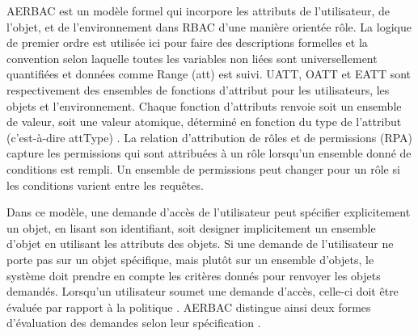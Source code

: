 \label{sectionModèleAEBAC}

AERBAC est un modèle formel qui incorpore les attributs de l'utilisateur, de l'objet, et de l'environnement dans RBAC d'une manière orientée rôle. La logique de premier ordre est utilisée ici pour faire des descriptions formelles et la convention selon laquelle toutes les variables non liées sont universellement quantifiées et données comme Range (att) est suivi. UATT, OATT et EATT sont respectivement des ensembles de fonctions d'attribut pour les utilisateurs, les objets et l'environnement. Chaque fonction d'attributs renvoie soit un ensemble de valeur, soit une valeur atomique, déterminé en fonction du type de l'attribut (c'est-à-dire attType) \cite{rajpoot15}. 
La relation d'attribution de rôles et de permissions (RPA) capture les permissions qui sont attribuées à un rôle lorsqu'un ensemble donné de conditions est rempli. Un ensemble de permissions peut changer pour un rôle si les conditions varient entre les requêtes. 


Dans ce modèle, une demande d'accès de l'utilisateur peut spécifier explicitement un objet, en lisant son identifiant, soit designer implicitement un ensemble d'objet en utilisant les attributs des objets. Si une demande de l'utilisateur ne porte pas sur un objet spécifique, mais plutôt sur un ensemble d'objets, le système doit prendre en compte les critères donnés pour renvoyer les objets demandés. Lorsqu'un utilisateur soumet une demande d'accès, celle-ci doit être évaluée par rapport à la politique . AERBAC distingue ainsi deux formes d'évaluation des demandes selon leur spécification \cite{rajpoot15}.

